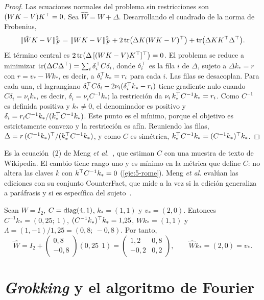 \begin{proof}
Las ecuaciones normales del problema sin restricciones son $(WK-V)K^{\top}=0$. Sea $\hat W=W+\Delta$. Desarrollando el cuadrado de la norma de Frobenius,
\[
\lVert\hat WK-V\rVert_F^{2}=\lVert WK-V\rVert_F^{2}+2\operatorname{tr}\bigl(\Delta K(WK-V)^{\top}\bigr)+\operatorname{tr}\bigl(\Delta KK^{\top}\Delta^{\top}\bigr).
\]
El término central es $2\operatorname{tr}\bigl(\Delta\,[(WK-V)K^{\top}]^{\top}\bigr)=0$. El problema se reduce a minimizar $\operatorname{tr}(\Delta C\Delta^{\top})=\sum_i\delta_i^{\top} C\delta_i$, donde $\delta_i^{\top}$ es la fila $i$ de $\Delta$, sujeto a $\Delta k_*=r$ con $r=v_*-Wk_*$, es decir, a $\delta_i^{\top} k_*=r_i$ para cada $i$. Las filas se desacoplan. Para cada una, el lagrangiano $\delta_i^{\top} C\delta_i-2\nu_i(\delta_i^{\top} k_*-r_i)$ tiene gradiente nulo cuando $C\delta_i=\nu_ik_*$, es decir, $\delta_i=\nu_iC^{-1}k_*$; la restricción da $\nu_i\,k_*^{\top} C^{-1}k_*=r_i$. Como $C^{-1}$ es definida positiva y $k_*\neq 0$, el denominador es positivo y $\delta_i=r_iC^{-1}k_*/(k_*^{\top} C^{-1}k_*)$. Este punto es el mínimo, porque el objetivo es estrictamente convexo y la restricción es afín. Reuniendo las filas, $\Delta=r\,(C^{-1}k_*)^{\top}/(k_*^{\top} C^{-1}k_*)$, y como $C$ es simétrica, $k_*^{\top} C^{-1}k_*=(C^{-1}k_*)^{\top} k_*$.
\end{proof}

Es la ecuación~(2) de Meng \emph{et al.}~\cite[§3.1]{meng}, que estiman $C$ con una muestra de texto de Wikipedia. El cambio tiene rango uno y es mínimo en la métrica que define $C$: no altera las claves $k$ con $k^{\top} C^{-1}k_*=0$ (\cref{eje:5-rome}). Meng \emph{et al.} evalúan las ediciones con su conjunto CounterFact, que mide a la vez si la edición generaliza a paráfrasis y si es específica del sujeto~\cite[§3.3]{meng}.

\begin{ejemplo}\label{ej:rome}
Sean $W=I_2$, $C=\operatorname{diag}(4,1)$, $k_*=(1,1)$ y $v_*=(2,0)$. Entonces $C^{-1}k_*=(0{,}25;\allowbreak\ 1)$, $(C^{-1}k_*)^{\top} k_*=1{,}25$, $Wk_*=(1,1)$ y $\Lambda=(1,-1)/1{,}25=(0{,}8;\allowbreak\ -0{,}8)$. Por tanto,
\[
\hat W=I_2+\begin{pmatrix}0{,}8\\-0{,}8\end{pmatrix}(0{,}25\ \ 1)=\begin{pmatrix}1{,}2&0{,}8\\-0{,}2&0{,}2\end{pmatrix},\qquad \hat Wk_*=(2,0)=v_*.
\]
\end{ejemplo}

\section{\emph{Grokking} y el algoritmo de Fourier}

